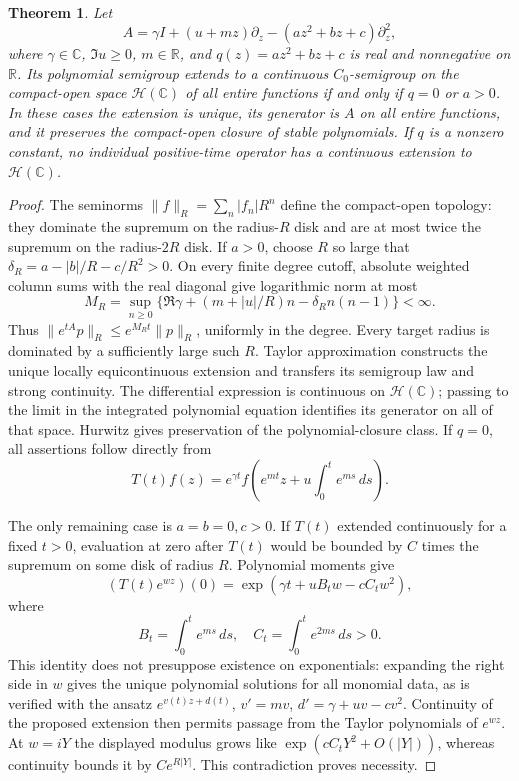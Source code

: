 \documentclass[reqno]{amsart}
\newtheorem{theorem}{Theorem}[section]
\theoremstyle{definition}
\theoremstyle{remark}
\newcommand{\C}{\mathbb C}
\newcommand{\R}{\mathbb R}
\begin{document}
\begin{theorem}\label{ana:entire-unary}
Let
\[
 A=\gamma I+(u+mz)\partial_z-(az^2+bz+c)\partial_z^2,
\]
where \(\gamma\in\C\), \(\Im u\ge0\), \(m\in\R\), and
\(q(z)=az^2+bz+c\) is real and nonnegative on \(\R\).
Its polynomial semigroup extends to a continuous \(C_0\)-semigroup
on the compact-open space \(\mathcal H(\C)\) of all entire functions if
and only if \(q=0\) or \(a>0\).  In these cases the extension is unique,
its generator is \(A\) on all entire functions, and it preserves the
compact-open closure of stable polynomials.  If \(q\) is a nonzero
constant, no individual positive-time operator has a continuous
extension to \(\mathcal H(\C)\).
\end{theorem}
\begin{proof}
The seminorms \(\|f\|_R=\sum_n|f_n|R^n\) define the compact-open topology:
they dominate the supremum on the radius-\(R\) disk and are at most twice
the supremum on the radius-\(2R\) disk.
If \(a>0\), choose \(R\) so large that
\(\delta_R=a-|b|/R-c/R^2>0\).
On every finite degree cutoff, absolute weighted column sums with the
real diagonal give logarithmic norm at most
\[
 M_R=\sup_{n\ge0}\{
 \Re\gamma+(m+|u|/R)n-\delta_R n(n-1)\}<\infty.
\]
Thus \(\|e^{tA}p\|_R\le e^{M_Rt}\|p\|_R\), uniformly in the degree.
Every target radius is dominated by a sufficiently large such \(R\).
Taylor approximation constructs the unique locally equicontinuous
extension and transfers its semigroup law and strong continuity.
The differential expression is continuous on \(\mathcal H(\C)\);
passing to the limit in the integrated polynomial equation identifies
its generator on all of that space.  Hurwitz gives preservation of the
polynomial-closure class.
If \(q=0\), all assertions follow directly from
\[
 T(t)f(z)=e^{\gamma t}
 f\left(e^{mt}z+u\int_0^t e^{ms}\,ds\right).
\]

The only remaining case is \(a=b=0,c>0\).
If \(T(t)\) extended continuously for a fixed \(t>0\), evaluation at zero
after \(T(t)\) would be bounded by \(C\) times the supremum on some disk
of radius \(R\).  Polynomial moments give
\[
 (T(t)e^{wz})(0)
 =\exp\left(\gamma t+uB_tw-cC_tw^2\right),
\]
where
\[
 B_t=\int_0^t e^{ms}\,ds,\quad C_t=\int_0^t e^{2ms}\,ds>0.
\]
This identity does not presuppose existence on exponentials: expanding
the right side in \(w\) gives the unique polynomial solutions for all
monomial data, as is verified with
the ansatz \(e^{v(t)z+d(t)}\), \(v'=mv\),
\(d'=\gamma+uv-cv^2\).
Continuity of the proposed extension then permits passage from the
Taylor polynomials of \(e^{wz}\).
At \(w=iY\) the displayed modulus grows like
\(\exp(cC_tY^2+O(|Y|))\), whereas continuity bounds it by
\(C e^{R|Y|}\).  This contradiction proves necessity.
\end{proof}
\end{document}
